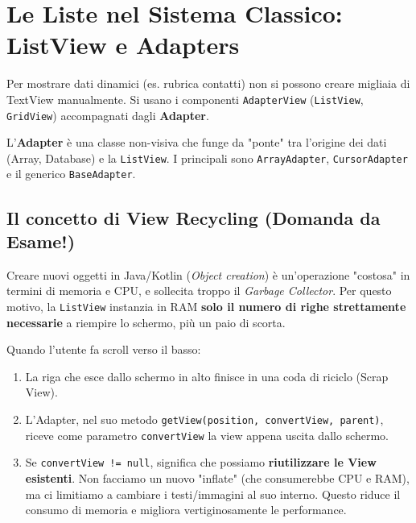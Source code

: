 \section{Le Liste nel Sistema Classico: ListView e Adapters}
Per mostrare dati dinamici (es.
rubrica contatti) non si possono creare migliaia di TextView manualmente.
Si usano i componenti \texttt{AdapterView} (\texttt{ListView}, \texttt{GridView}) accompagnati dagli \textbf{Adapter}.

L'\textbf{Adapter} è una classe non-visiva che funge da "ponte" tra l'origine dei dati (Array, Database) e la \texttt{ListView}.
I principali sono \texttt{ArrayAdapter}, \texttt{CursorAdapter} e il generico \texttt{BaseAdapter}.

\subsection{Il concetto di View Recycling (Domanda da Esame!)}
Creare nuovi oggetti in Java/Kotlin (\textit{Object creation}) è un'operazione "costosa" in termini di memoria e CPU, e sollecita troppo il \textit{Garbage Collector}.
Per questo motivo, la \texttt{ListView} instanzia in RAM \textbf{solo il numero di righe strettamente necessarie} a riempire lo schermo, più un paio di scorta.

Quando l'utente fa scroll verso il basso:
\begin{enumerate}
    \item La riga che esce dallo schermo in alto finisce in una coda di riciclo (Scrap View).
    \item L'Adapter, nel suo metodo \texttt{getView(position, convertView, parent)}, riceve come parametro \texttt{convertView} la view appena uscita dallo schermo.
    \item Se \texttt{convertView != null}, significa che possiamo \textbf{riutilizzare le View esistenti}.
    Non facciamo un nuovo "inflate" (che consumerebbe CPU e RAM), ma ci limitiamo a cambiare i testi/immagini al suo interno. Questo riduce il consumo di memoria e migliora vertiginosamente le performance.
\end{enumerate}

